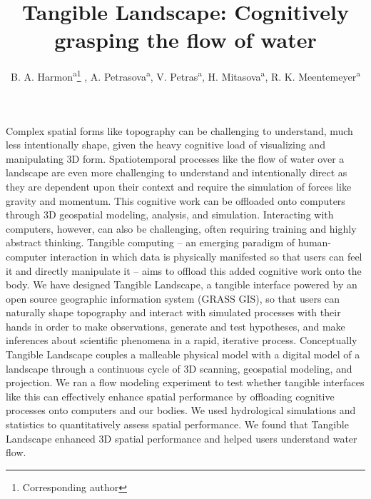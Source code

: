 \documentclass{isprs}
\begin{document}
\title{Tangible Landscape: Cognitively grasping the flow of water}

\author{
 B. A. Harmon\textsuperscript{a}\thanks{Corresponding author}
 , A. Petrasova\textsuperscript{a}, V. Petras\textsuperscript{a}, H. Mitasova\textsuperscript{a}, R. K. Meentemeyer\textsuperscript{a}}

\address
{
	\textsuperscript{a }Center for Geospatial Analytics, North Carolina State University - (baharmon, akratoc, vpetras, hmitaso, rkmeente)@ncsu.edu\\
}

\commission{}{} %
\workinggroup{} %
\icwg{}   %

\abstract
{
Complex spatial forms like topography can be challenging to understand, much less intentionally shape, given the heavy cognitive load of visualizing and manipulating 3D form. Spatiotemporal processes like the flow of water over a landscape are even more challenging to understand and intentionally direct as they are dependent upon their context and require the simulation of forces like gravity and momentum. This cognitive work can be offloaded onto computers through 3D geospatial modeling, analysis, and simulation.
Interacting with computers, however, can also be challenging, often requiring training and highly abstract thinking. Tangible computing -- an emerging paradigm of human-computer interaction in which data is physically manifested so that users can feel it and directly manipulate it -- aims to offload this added cognitive work onto the body. We have designed Tangible Landscape, a tangible interface powered by an open source geographic information system (GRASS GIS), so that users can naturally shape topography and interact with simulated processes with their hands in order to make observations, generate and test hypotheses, and make inferences about scientific phenomena in a rapid, iterative process. Conceptually Tangible Landscape couples a malleable physical model with a digital model of a landscape through a continuous cycle of 3D scanning, geospatial modeling, and projection. 
We ran a flow modeling experiment to test whether tangible interfaces like this can effectively enhance spatial performance by offloading cognitive processes onto computers and our bodies. We used hydrological simulations and statistics to quantitatively assess spatial performance. We found that Tangible Landscape enhanced 3D spatial performance and helped users understand water flow. 
}
\end{document}
